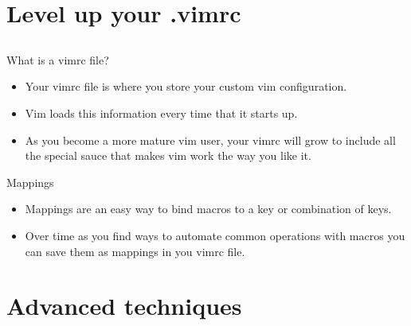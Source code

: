 \documentclass{beamer}
\begin{document}
    \section{Level up your .vimrc}
    \subsection{}
    \begin{frame}{What is a vimrc file?}
        \begin{itemize}
            \item Your vimrc file is where you store your custom vim configuration.
            \item Vim loads this information every time that it starts up.
            \item As you become a more mature vim user, your vimrc will grow to include all the special sauce that makes vim work the way you like it.
        \end{itemize}
    \end{frame}
    \begin{frame}{Mappings}
        \begin{itemize}
            \item Mappings are an easy way to bind macros to a key or combination of keys.
            \item Over time as you find ways to automate common operations with macros you can save them as mappings in you vimrc file.
        \end{itemize}
    \end{frame}
    \section{Advanced techniques}
\end{document}
